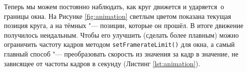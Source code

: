 Теперь мы можем постоянно наблюдать, как круг движется и \flqq ударяется\frqq\ о границы окна. На Рисунке \ref{fig:animation} светлым цветом показана текущая позиция круга, а на тёмных "--- позиции, которые он прошёл. В итоге движение получилось неидальным. Чтобы его улучшить (сделать более плавным) можно ограничить частоту кадров методом \texttt{setFramerateLimit()} для окна, а самый главный способ "--- преобразовать скорость из значения за кадр в значение, не зависящее от частоты кадров в секунду (Листинг \ref{lst:animation}). 